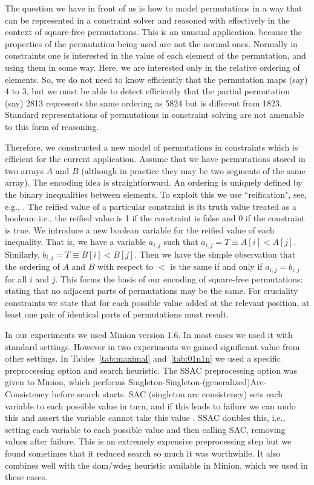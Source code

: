 \documentclass[12pt,reqno]{article}
\begin{document}
The question we have in front of us is how to model permutations in a way that can be represented in a constraint solver 
and reasoned with effectively in the context of square-free permutations.   This is an unusual application, because the properties of the permutation being used are not the normal ones. Normally in constraints one is interested in the value of each element of the permutation, and using them in some way.   Here, we are interested only in the 
relative ordering of elements.  So, we do not need to know efficiently that  the permutation maps (say) 4 to 3, but we must be able to detect efficiently that the partial permutation (say) 2813 represents the same ordering as 5824 but is different from 1823.   Standard representations of permutations in constraint solving are not amenable to this form of reasoning. 

Therefore, we constructed a new model of permutations in constraints which is efficient for the current application.
Assume that we have permutations stored in two arrays $A$ and $B$ (although in practice they may be two segments of the same array).  
The encoding idea is  straightforward.  
An ordering is uniquely defined by the binary inequalities between elements. 
To exploit this we use ``reification", see, e.g., \cite{reification}.  The reified value of a particular constraint 
is its truth value treated as a boolean: i.e., the reified value is 1 if the constraint is false and 0 if the constraint is true.
We  introduce a new boolean variable for the reified value of each 
inequality.  That is, we have a variable $a_{i,j}$ such that 
$a_{i,j} = T \equiv A[i] < A[j]$.  Similarly,
$b_{i,j} = T \equiv B[i] < B[j]$.  
Then we have the simple observation that the ordering of $A$ and $B$ with respect
to $<$ is the same if and only if $a_{i,j} = b_{i,j}$ for all $i$ and $j$.
This forms the basis of our encoding of square-free permutations: stating that no adjacent parts of permutations may be the same.  For cruciality constraints we state that for each possible value added at the relevant position, at least one pair of identical parts of permutations must result.

In our experiments we used Minion version 1.6.   In most cases we used it with standard settings.  However in two experiments we gained significant value from other settings.  In Tables~\ref{tab:maximal} and~\ref{tab:01n1n} we 
used a specific preprocessing option and search heuristic. The SSAC preprocessing option was given to Minion, which performs Singleton-Singleton-(generalized)Arc-Consistency before search starts.   SAC (singleton arc consistency) sets each variable  to each possible value in turn, and if this leads to failure we can undo this and assert the variable cannot take this value \cite{singleton}.   SSAC doubles this, i.e., setting each variable to each possible value and then calling SAC, removing values after failure.  This is an extremely expensive preprocessing step but we found sometimes that it reduced search so much it was worthwhile.   It also combines well with the  dom/wdeg heuristic available in Minion, which we used in these cases.   
\end{document}
